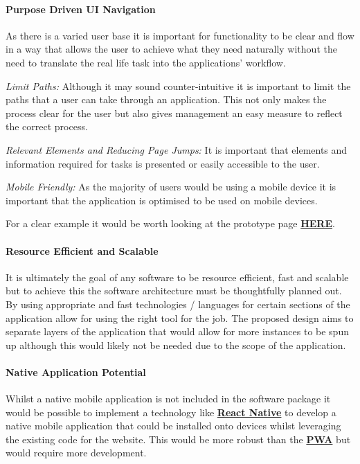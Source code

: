 \paragraph{Purpose Driven UI Navigation}
As there is a varied user base it is important for functionality to be clear and flow in a way that allows the user
to achieve what they need naturally without the need to translate the real life task into the applications' workflow.
\begin{description}
    \item \emph{Limit Paths:} Although it may sound counter-intuitive it is important to limit the paths that a user can take through
    an application.
    This not only makes the process clear for the user but also gives management an easy measure to reflect the correct process.
    \item \emph{Relevant Elements and Reducing Page Jumps:} It is important that elements and information required for tasks is presented or easily accessible to the user.

    \item \emph{Mobile Friendly:} As the majority of users would be using a mobile device it is important that the application is optimised
    to be used on mobile devices.
\end{description}

For a clear example it would be worth looking at the prototype page \href{https://cpr.caleb-dunn.tech/jsheet/5116}{\textbf{HERE}}.

\paragraph{Resource Efficient and Scalable}
It is ultimately the goal of any software to be resource efficient, fast and scalable but to achieve this the software architecture must be
thoughtfully planned out.
By using appropriate and fast technologies / languages for certain sections of the application allow for using the right tool for the job.
The proposed design aims to separate layers of the application that would allow for more instances to be spun up although this would
likely not be needed due to the scope of the application.

\paragraph{Native Application Potential}
Whilst a native mobile application is not included in the software package it would be possible to implement a technology like \href{https://reactnative.dev/}{\textbf{React Native}} to
develop a native mobile application that could be installed onto devices whilst leveraging the existing code for the website.
This would be more robust than the \hyperref[para:pwa]{\textbf{PWA}} but would require more development.

